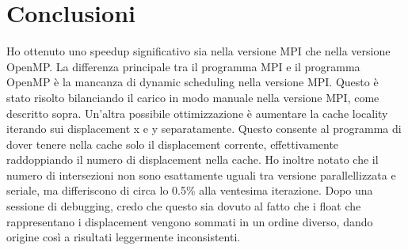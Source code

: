 \documentclass[a4paper,11pt, twoside]{report}
\begin{document}
\section*{Conclusioni}
Ho ottenuto uno speedup significativo sia nella versione MPI che nella versione OpenMP.
La differenza principale tra il programma MPI e il programma OpenMP è la mancanza di dynamic scheduling nella versione MPI.
Questo è stato risolto bilanciando il carico in modo manuale nella versione MPI, come descritto sopra.
Un'altra possibile ottimizzazione è aumentare la cache locality iterando sui displacement x e y separatamente.
Questo consente al programma di dover tenere nella cache solo il displacement corrente, effettivamente raddoppiando il numero di displacement nella cache.
Ho inoltre notato che il numero di intersezioni non sono esattamente uguali tra versione parallellizzata e seriale, ma differiscono di circa lo 0.5\% alla ventesima iterazione.
Dopo una sessione di debugging, credo che questo sia dovuto al fatto che i float che rappresentano i displacement vengono sommati in un ordine diverso, dando origine così a risultati leggermente inconsistenti.
\end{document}
